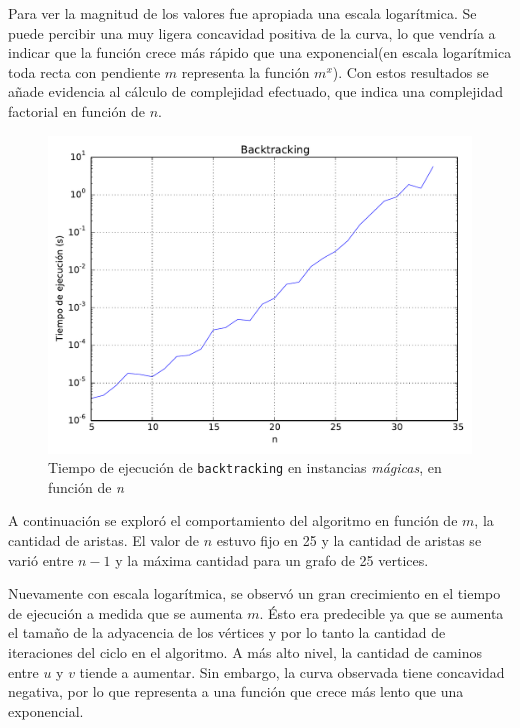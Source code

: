 Para ver la magnitud de los valores fue apropiada una escala logarítmica. Se puede percibir una muy ligera concavidad positiva de la curva, lo que vendría a indicar que la función crece más rápido que una exponencial(en escala logarítmica toda recta con pendiente $m$ representa la función $m^x$). Con estos resultados se añade evidencia al cálculo de complejidad efectuado, que indica una complejidad factorial en función de $n$.

\begin{figure}[H]
    \begin{center}
        \includegraphics[width=\textwidth]{imagenes/backtracking-complejidad-funcion-de-n.pdf}
        \caption{Tiempo de ejecución de \texttt{backtracking} en instancias \textit{mágicas}, en función de \textit{n}}
    \end{center}
\end{figure}

\newpage
A continuación se exploró el comportamiento del algoritmo en función de $m$, la cantidad de aristas. El valor de $n$ estuvo fijo en 25 y la cantidad de aristas se varió entre $n-1$ y la máxima cantidad para un grafo de 25 vertices.

Nuevamente con escala logarítmica, se observó un gran crecimiento en el tiempo de ejecución a medida que se aumenta $m$. Ésto era predecible ya que se aumenta el tamaño de la adyacencia de los vértices y por lo tanto la cantidad de iteraciones del ciclo en el algoritmo. A más alto nivel, la cantidad de caminos entre $u$ y $v$ tiende a aumentar. Sin embargo, la curva observada tiene concavidad negativa, por lo que representa a una función que crece más lento que una exponencial.

